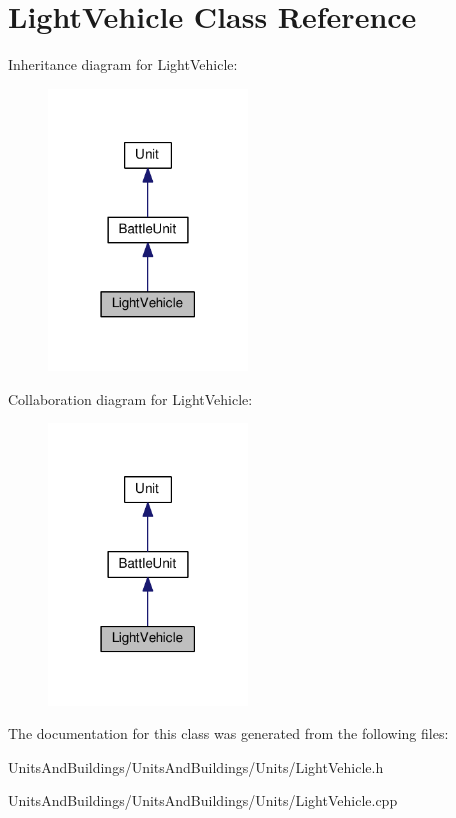 \hypertarget{class_light_vehicle}{}\section{Light\+Vehicle Class Reference}
\label{class_light_vehicle}


Inheritance diagram for Light\+Vehicle\+:
\nopagebreak
\begin{figure}[H]
\begin{center}
\leavevmode
\includegraphics[width=150pt]{class_light_vehicle__inherit__graph}
\end{center}
\end{figure}


Collaboration diagram for Light\+Vehicle\+:
\nopagebreak
\begin{figure}[H]
\begin{center}
\leavevmode
\includegraphics[width=150pt]{class_light_vehicle__coll__graph}
\end{center}
\end{figure}


The documentation for this class was generated from the following files\+:\begin{DoxyCompactItemize}
\item 
Units\+And\+Buildings/\+Units\+And\+Buildings/\+Units/Light\+Vehicle.\+h\item 
Units\+And\+Buildings/\+Units\+And\+Buildings/\+Units/Light\+Vehicle.\+cpp\end{DoxyCompactItemize}

